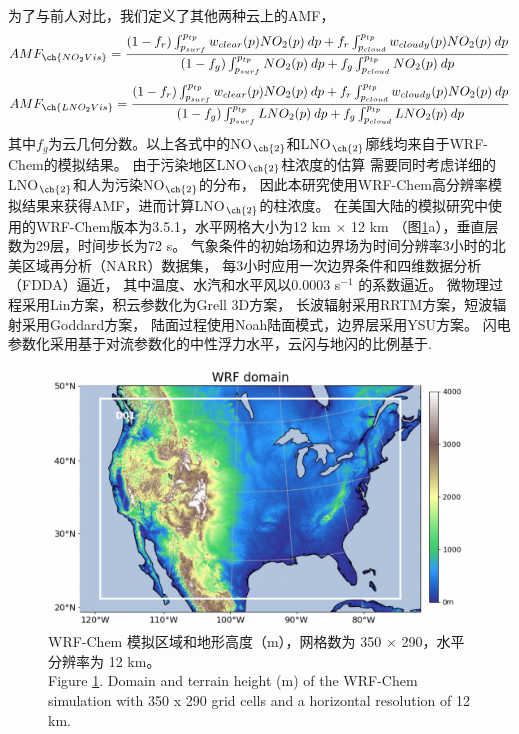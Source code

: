 为了与前人对比，我们定义了其他两种云上的AMF，
\begin{equation} \label{eq:AMF_NO2Vis}
AMF_{\ch{NO_2Vis}} = \frac{(1-f_r) \int_{p_{surf}}^{p_{tp}} w_{clear}(p) NO_2(p) \: dp + f_r \int_{p_{cloud}}^{p_{tp}} w_{cloudy}(p) NO_2(p) \: dp}{(1-f_g) \int_{p_{surf}}^{p_{tp}} NO_2(p) \: dp + f_g \int_{p_{cloud}}^{p_{tp}} NO_2(p) \: dp}
\end{equation}
\begin{equation} \label{eq:AMF_LNO2Vis}
AMF_{\ch{LNO_2Vis}} = \frac{(1-f_r) \int_{p_{surf}}^{p_{tp}} w_{clear}(p) NO_2(p) \: dp + f_r \int_{p_{cloud}}^{p_{tp}} w_{cloudy}(p) NO_2(p) \: dp}{(1-f_g) \int_{p_{surf}}^{p_{tp}} LNO_2(p) \: dp + f_g \int_{p_{cloud}}^{p_{tp}} LNO_2(p) \: dp}
\end{equation}
其中$f_g$为云几何分数。以上各式中的NO$_{\ch{2}}$和LNO$_{\ch{2}}$廓线均来自于WRF-Chem的模拟结果。
由于污染地区LNO$_{\ch{2}}$柱浓度的估算
需要同时考虑详细的LNO$_{\ch{2}}$和人为污染NO$_{\ch{2}}$的分布，
因此本研究使用WRF-Chem高分辨率模拟结果来获得AMF，进而计算LNO$_{\ch{2}}$的柱浓度。
在美国大陆的模拟研究中使用的WRF-Chem版本为3.5.1，水平网格大小为12 km $\times$ 12 km （图\ref{fig:us_domain}a），垂直层数为29层，时间步长为72 s。
气象条件的初始场和边界场为时间分辨率3小时的北美区域再分析（NARR）数据集，
每3小时应用一次边界条件和四维数据分析（FDDA）逼近，
其中温度、水汽和水平风以0.0003 s$^{-1}$ 的系数逼近\citep{Laughner.2017}。
微物理过程采用Lin方案\citep{Lin.1983}，积云参数化为Grell 3D方案\citep{Grell.1993a,Grell.2002a}，
长波辐射采用RRTM方案\citep{Iacono.2008}，短波辐射采用Goddard方案，
陆面过程使用Noah陆面模式\citep{Koren.1999}，边界层采用YSU方案\citep{Hong.2006}。
闪电参数化采用基于对流参数化的中性浮力水平\citep{Pickering.1992}，云闪与地闪的比例基于\citet{Boccippio.2001}.

\begin{figure}[H]
\centering
\includegraphics[width=11cm]{./figures/us_domain.png}
\caption{WRF-Chem 模拟区域和地形高度（m），网格数为 350 $\times$ 290，水平分辨率为 12 km。 \\
Figure \ref{fig:us_domain}. Domain and terrain height (m) of the WRF-Chem simulation with 350 x 290 grid cells and a horizontal resolution of 12 km.}
\label{fig:us_domain}
\end{figure}

